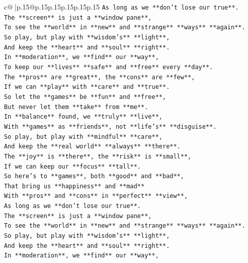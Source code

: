 \documentclass{article}
\begin{document}
{\begin{supertabular}{c@{$\;$}|p{.15\linewidth}@{}p{.15\linewidth}p{.15\linewidth}p{.15\linewidth}p{.15\linewidth}p{.15\linewidth}}
{{{\texttt{As long as we **don't lose our true**.} \\
\texttt{The **screen** is just a **window pane**,} \\
\texttt{To see the **world** in **new** and **strange** **ways** **again**.} \\
\texttt{So play, but play with **wisdom's** **light**,} \\
\texttt{And keep the **heart** and **soul** **right**.} \\
\texttt{In **moderation**, we **find** our **way**,} \\
\texttt{To keep our **lives** **safe** and **free** every **day**.} \\
\texttt{The **pros** are **great**, the **cons** are **few**,} \\
\texttt{If we can **play** with **care** and **true**.} \\
\texttt{So let the **games** be **fun** and **free**,} \\
\texttt{But never let them **take** from **me**.} \\
\texttt{In **balance** found, we **truly** **live**,} \\
\texttt{With **games** as **friends**, not **life's** **disguise**.} \\
\texttt{So play, but play with **mindful** **care**,} \\
\texttt{And keep the **real world** **always** **there**.} \\
\texttt{The **joy** is **there**, the **risk** is **small**,} \\
\texttt{If we can keep our **focus** **tall**.} \\
\texttt{So here's to **games**, both **good** and **bad**,} \\
\texttt{That bring us **happiness** and **mad**} \\
\texttt{With **pros** and **cons** in **perfect** **view**,} \\
\texttt{As long as we **don't lose our true**.} \\
\texttt{The **screen** is just a **window pane**,} \\
\texttt{To see the **world** in **new** and **strange** **ways** **again**.} \\
\texttt{So play, but play with **wisdom's** **light**,} \\
\texttt{And keep the **heart** and **soul** **right**.} \\
\texttt{In **moderation**, we **find** our **way**,} \\
}}}
\end{supertabular}}
\end{document}
